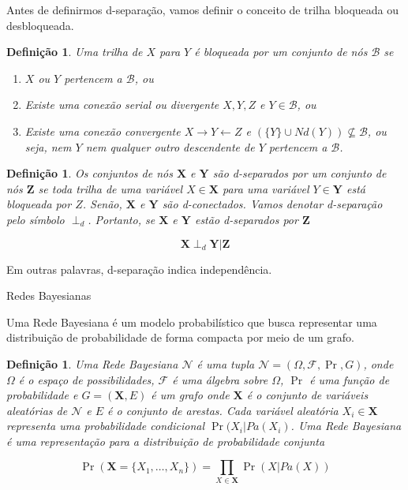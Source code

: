 \documentclass{amsart}
\makeatletter
\def\subsection{\@startsection{subsection}{3}%
  \z@{.5\linespacing\@plus.7\linespacing}{.1\linespacing}%
  {\normalfont\itshape}}
\theoremstyle{plain}
\newcounter{dummy-def}\numberwithin{dummy-def}{subsection}
\newtheorem{definition}[dummy-def]{Definição}
\newcounter{dummy-thm}\numberwithin{dummy-thm}{subsection}
\newcounter{dummy-prop}\numberwithin{dummy-prop}{subsection}
\newcounter{dummy-ex}\numberwithin{dummy-ex}{subsection}
\newcounter{dummy-eg}\numberwithin{dummy-eg}{subsection}
\numberwithin{equation}{subsection}
\newcommand{\set}[1]{\mathbf{#1}}
\makeatother
\begin{document}
Antes de definirmos d-separação, vamos definir o conceito de trilha bloqueada ou desbloqueada.

\begin{definition}
  Uma trilha de $X$ para $Y$ é bloqueada por um conjunto de nós $\mathcal{B}$ se
  \begin{enumerate}
    \item $X$ ou $Y$ pertencem a $\mathcal{B}$, ou
    \item Existe uma conexão serial ou divergente $X,Y,Z$ e $Y\in\mathcal{B}$, ou
    \item Existe uma conexão convergente $X\to Y\gets Z$ e $(\{Y\}\cup Nd(Y))\not\subseteq
      \mathcal{B}$, ou seja, nem $Y$ nem qualquer outro descendente de $Y$ pertencem a
      $\mathcal{B}$.
  \end{enumerate}
\end{definition}

\begin{definition}
  Os conjuntos de nós $\set{X}$ e $\set{Y}$ são d-separados por um conjunto de nós $\set{Z}$ se
  toda trilha de uma variável $X\in\set{X}$ para uma variável $Y\in\set{Y}$ está bloqueada por $Z$.
  Senão, $\set{X}$ e $\set{Y}$ são d-conectados. Vamos denotar d-separação pelo símbolo $\perp_d$.
  Portanto, se $\set{X}$ e $\set{Y}$ estão d-separados por $\set{Z}$

  \begin{equation*}
    \set{X}\perp_d\set{Y}|\set{Z}
  \end{equation*}
\end{definition}

Em outras palavras, d-separação indica independência.

\subsection{Redes Bayesianas}

Uma Rede Bayesiana é um modelo probabilístico que busca representar uma distribuição de
probabilidade de forma compacta por meio de um grafo.

\begin{definition}
  Uma Rede Bayesiana $\mathcal{N}$ é uma tupla $\mathcal{N}=(\Omega,\mathcal{F},\Pr,G)$, onde
  $\Omega$ é o espaço de possibilidades, $\mathcal{F}$ é uma álgebra sobre $\Omega$, $\Pr$ é uma
  função de probabilidade e $G=(\set{X},E)$ é um grafo onde $\set{X}$ é o conjunto de variáveis
  aleatórias de $\mathcal{N}$ e $E$ é o conjunto de arestas. Cada variável aleatória
  $X_i\in\set{X}$ representa uma probabilidade condicional $\Pr(X_i|Pa(X_i)$. Uma Rede Bayesiana é
  uma representação para a distribuição de probabilidade conjunta

  \begin{equation*}
    \Pr(\set{X}=\{X_1,\ldots,X_n\})=\prod_{X\in\set{X}} \Pr(X|Pa(X))
  \end{equation*}
\end{definition}
\end{document}
